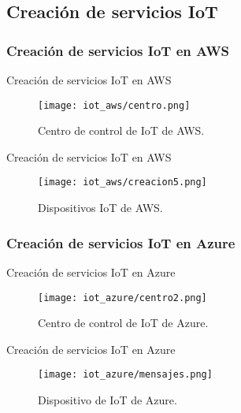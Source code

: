 \documentclass[aspectratio=169]{beamer}
\begin{document}
\subsection{Creación de servicios IoT}
\subsubsection{Creación de servicios IoT en AWS}
\begin{frame}{Creación de servicios IoT en AWS}
	\begin{figure}[h]
		\centering
		\texttt{[image: iot\_aws/centro.png]}
		\caption{Centro de control de IoT de AWS.}
		\label{Centro de control de IoT de AWS}
	\end{figure}
\end{frame}

\begin{frame}{Creación de servicios IoT en AWS}
\begin{figure}[h]
	\centering
	\texttt{[image: iot\_aws/creacion5.png]}
	\caption{Dispositivos IoT de AWS.}
	\label{Dispositivo IoT de AWS}
\end{figure}
\end{frame}

\subsubsection{Creación de servicios IoT en Azure}
\begin{frame}{Creación de servicios IoT en Azure}
\begin{figure}[h]
	\centering
	\texttt{[image: iot\_azure/centro2.png]}
	\caption{Centro de control de IoT de Azure.}
	\label{Centro de control de IoT de Azure}
\end{figure}
\end{frame}

\begin{frame}{Creación de servicios IoT en Azure}
\begin{figure}[h]
	\centering
	\texttt{[image: iot\_azure/mensajes.png]}
	\caption{Dispositivo de IoT de Azure.}
	\label{Dispositivo de IoT de Azure}
\end{figure}
\end{frame}
\end{document}
